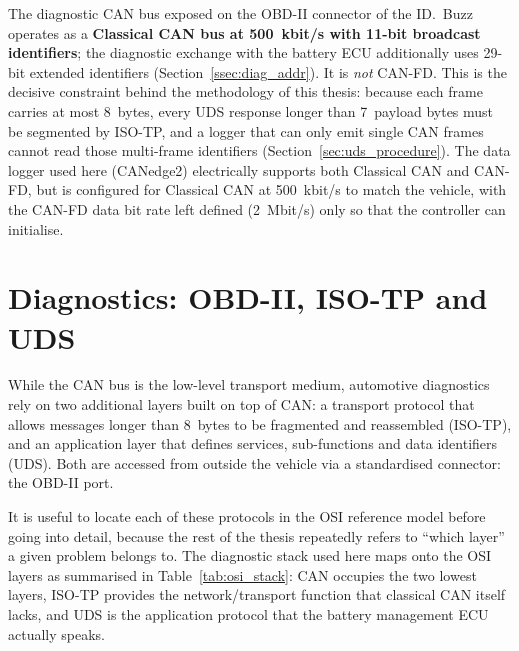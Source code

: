 \documentclass[11pt,a4paper,oneside,parskip=half]{scrreprt}
\begin{document}
The diagnostic CAN bus exposed on the OBD-II connector of the ID.~Buzz operates as a \textbf{Classical CAN bus at 500~kbit/s with 11-bit broadcast identifiers}; the diagnostic exchange with the battery ECU additionally uses 29-bit extended identifiers (Section~\ref{ssec:diag_addr}). It is \emph{not} CAN-FD. This is the decisive constraint behind the methodology of this thesis: because each frame carries at most 8~bytes, every UDS response longer than 7~payload bytes must be segmented by ISO-TP, and a logger that can only emit single CAN frames cannot read those multi-frame identifiers (Section~\ref{sec:uds_procedure}). The data logger used here (CANedge2) electrically supports both Classical CAN and CAN-FD, but is configured for Classical CAN at 500~kbit/s to match the vehicle, with the CAN-FD data bit rate left defined (2~Mbit/s) only so that the controller can initialise.

\section{Diagnostics: OBD-II, ISO-TP and UDS}
While the CAN bus is the low-level transport medium, automotive diagnostics rely on two additional layers built on top of CAN: a transport protocol that allows messages longer than 8~bytes to be fragmented and reassembled (ISO-TP), and an application layer that defines services, sub-functions and data identifiers (UDS). Both are accessed from outside the vehicle via a standardised connector: the OBD-II port.

It is useful to locate each of these protocols in the OSI reference model before going into detail, because the rest of the thesis repeatedly refers to ``which layer'' a given problem belongs to. The diagnostic stack used here maps onto the OSI layers as summarised in Table~\ref{tab:osi_stack}: CAN occupies the two lowest layers, ISO-TP provides the network/transport function that classical CAN itself lacks, and UDS is the application protocol that the battery management ECU actually speaks.
\end{document}
